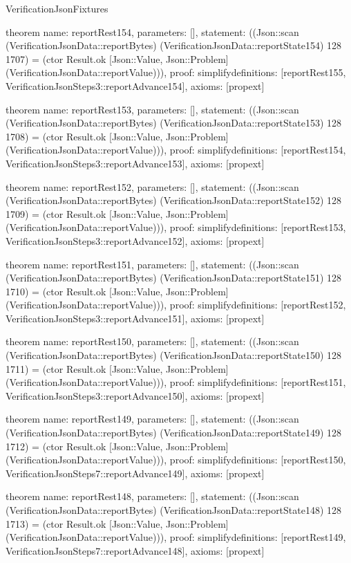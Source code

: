 \begin{lexlean}{VerificationJsonFixtures}
\begin{semanticmodule}
theorem{
  name: reportRest154,
  parameters: [],
  statement: ((Json::scan (VerificationJsonData::reportBytes) (VerificationJsonData::reportState154) 128 1707) = (ctor Result.ok [Json::Value, Json::Problem] (VerificationJsonData::reportValue))),
  proof: simplify{definitions: [reportRest155, VerificationJsonSteps3::reportAdvance154]},
  axioms: [propext]
}

theorem{
  name: reportRest153,
  parameters: [],
  statement: ((Json::scan (VerificationJsonData::reportBytes) (VerificationJsonData::reportState153) 128 1708) = (ctor Result.ok [Json::Value, Json::Problem] (VerificationJsonData::reportValue))),
  proof: simplify{definitions: [reportRest154, VerificationJsonSteps3::reportAdvance153]},
  axioms: [propext]
}

theorem{
  name: reportRest152,
  parameters: [],
  statement: ((Json::scan (VerificationJsonData::reportBytes) (VerificationJsonData::reportState152) 128 1709) = (ctor Result.ok [Json::Value, Json::Problem] (VerificationJsonData::reportValue))),
  proof: simplify{definitions: [reportRest153, VerificationJsonSteps3::reportAdvance152]},
  axioms: [propext]
}

theorem{
  name: reportRest151,
  parameters: [],
  statement: ((Json::scan (VerificationJsonData::reportBytes) (VerificationJsonData::reportState151) 128 1710) = (ctor Result.ok [Json::Value, Json::Problem] (VerificationJsonData::reportValue))),
  proof: simplify{definitions: [reportRest152, VerificationJsonSteps3::reportAdvance151]},
  axioms: [propext]
}

theorem{
  name: reportRest150,
  parameters: [],
  statement: ((Json::scan (VerificationJsonData::reportBytes) (VerificationJsonData::reportState150) 128 1711) = (ctor Result.ok [Json::Value, Json::Problem] (VerificationJsonData::reportValue))),
  proof: simplify{definitions: [reportRest151, VerificationJsonSteps3::reportAdvance150]},
  axioms: [propext]
}

theorem{
  name: reportRest149,
  parameters: [],
  statement: ((Json::scan (VerificationJsonData::reportBytes) (VerificationJsonData::reportState149) 128 1712) = (ctor Result.ok [Json::Value, Json::Problem] (VerificationJsonData::reportValue))),
  proof: simplify{definitions: [reportRest150, VerificationJsonSteps7::reportAdvance149]},
  axioms: [propext]
}

theorem{
  name: reportRest148,
  parameters: [],
  statement: ((Json::scan (VerificationJsonData::reportBytes) (VerificationJsonData::reportState148) 128 1713) = (ctor Result.ok [Json::Value, Json::Problem] (VerificationJsonData::reportValue))),
  proof: simplify{definitions: [reportRest149, VerificationJsonSteps7::reportAdvance148]},
  axioms: [propext]
}


\end{semanticmodule}
\end{lexlean}
